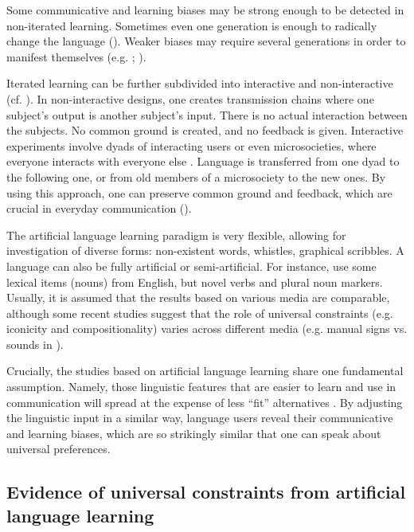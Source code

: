 \documentclass[output=paper]{langsci/langscibook}
\begin{document}
Some communicative and learning biases may be strong enough to be detected in non-iterated learning. Sometimes even one generation is enough to radically change the language (\citealt{HudsonKamNewport2009}). Weaker biases may require several generations in order to manifest themselves (e.g. \citealt{RealiGriffiths2009}; \citealt{SmithWonnacott2010}). 

Iterated learning can be further subdivided into interactive and non-interactive (cf. \citealt{Tamariz2017}). In non-interactive designs, one creates transmission chains where one subject’s output is another subject’s input. There is no actual interaction between the subjects. No common ground is created, and no feedback is given. Interactive experiments involve dyads of interacting users or even microsocieties, where everyone interacts with everyone else \citep{Tamariz2017}. Language is transferred from one dyad to the following one, or from old members of a microsociety to the new ones. By using this approach, one can preserve common ground and feedback, which are crucial in everyday communication (\citealt{CaldwellSmith2012}). 

The artificial language learning paradigm is very flexible, allowing for investigation of diverse forms: non-existent words, whistles, graphical scribbles. A language can also be fully artificial or semi-artificial. For instance, \citet{SmithWonnacott2010} use some lexical items (nouns) from English, but novel verbs and plural noun markers. Usually, it is assumed that the results based on various media are comparable, although some recent studies suggest that the role of universal constraints (e.g. iconicity and compositionality) varies across different media (e.g. manual signs vs. sounds in \citealt{LittleEtAl2017}).

Crucially, the studies based on artificial language learning share one fundamental assumption. Namely, those linguistic features that are easier to learn and use in communication will spread at the expense of less “fit” alternatives \citep{SmithEtAl2017}. By adjusting the linguistic input in a similar way, language users reveal their communicative and learning biases, which are so strikingly similar that one can speak about universal preferences. 

\subsection{Evidence of universal constraints from artificial language learning}
\end{document}
